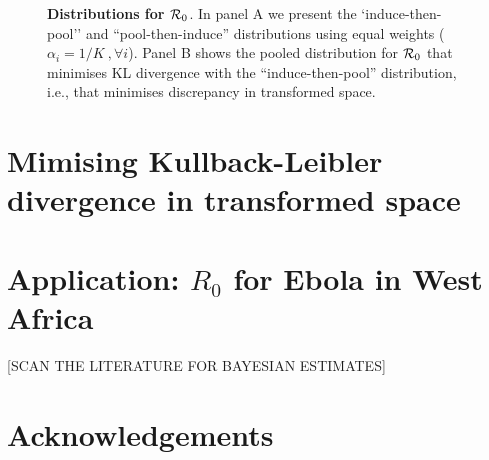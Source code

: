 \documentclass[11pt]{article}
\begin{document}
\begin{figure}
\begin{center}
\end{center}
\caption{
\textbf{Distributions for ${\cal R}_0$}.
In panel A we present the `induce-then-pool'' and ``pool-then-induce'' distributions using equal weights ($\alpha_i = 1/K \:, \forall i$).
Panel B shows the pooled distribution for ${\cal R}_0$ that minimises KL divergence with the ``induce-then-pool'' distribution, i.e., that minimises discrepancy in transformed space.
}
\label{fig:transformAndKL}
\end{figure}

\section{Mimising Kullback-Leibler divergence in transformed space}


\section{Application: $R_0$ for Ebola in West Africa}
[SCAN THE LITERATURE FOR BAYESIAN ESTIMATES]
\section*{Acknowledgements}

\end{document}
